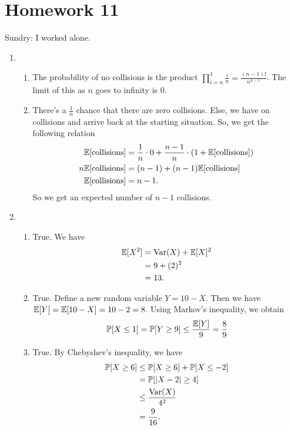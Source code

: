 \section{Homework 11}
Sundry: I worked alone.

\begin{enumerate}
    \item \begin{enumerate}
        \item The probability of no collisions is the product $\prod_{i = n}^1 \frac{i}{n} = \frac{(n-1)!}{n^{n-1}}$. The limit of this as $n$ goes to infinity is 0.
        
        \item There's a $\frac{1}{n}$ chance that there are zero collisions. Else, we have on collisions and arrive back at the starting situation. So, we get the following relation
        \begin{align*}
            \mathbb{E}[\text{collisions}] &= \frac{1}{n} \cdot 0 + \frac{n-1}{n} \cdot (1 + \mathbb{E}[\text{collisions}]) \\
            n\mathbb{E}[\text{collisions}] &= (n - 1) + (n - 1)\mathbb{E}[\text{collisions}] \\
            \mathbb{E}[\text{collisions}] &= n - 1.
        \end{align*}
        So we get an expected number of $n - 1$ collisions.
    \end{enumerate}
    
    \item \begin{enumerate}
        \item True. We have
        \begin{align*}
            \mathbb{E}[X^2] &= \text{Var}(X) + \mathbb{E}[X]^2 \\
                &= 9 + (2)^2 \\
                &= 13.
        \end{align*}
        
        \item True. Define a new random variable $Y = 10 - X$. Then we have $\mathbb{E}[Y] = \mathbb{E}[10 - X] = 10 - 2 = 8$. Using Markov's inequality, we obtain
        \[
        \mathbb{P}[X \leq 1] = \mathbb{P}[Y \geq 9] \leq \frac{\mathbb{E}[Y]}{9} = \frac{8}{9}
        \]
        
        \item True. By Chebyshev's inequality, we have
        \begin{align*}
            \mathbb{P}[X \geq 6] &\leq \mathbb{P}[X \geq 6] + \mathbb{P}[X \leq -2] \\
                &= \mathbb{P}[|X - 2| \geq 4] \\
                &\leq \frac{\text{Var}(X)}{4^2} \\
                &= \frac{9}{16}.
        \end{align*}
        

\end{enumerate}
\end{enumerate}
